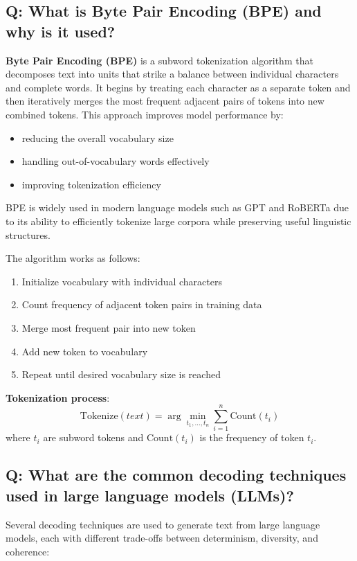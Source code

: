 \subsection*{Q: What is Byte Pair Encoding (BPE) and why is it used?}
\textbf{Byte Pair Encoding (BPE)} is a subword tokenization algorithm that decomposes text into units that strike a balance between individual characters and complete words. It begins by treating each character as a separate token and then iteratively merges the most frequent adjacent pairs of tokens into new combined tokens. This approach improves model performance by:
\begin{itemize}
	\item reducing the overall vocabulary size
	\item handling out-of-vocabulary words effectively
	\item improving tokenization efficiency
\end{itemize}

BPE is widely used in modern language models such as GPT and RoBERTa due to its ability to efficiently tokenize large corpora while preserving useful linguistic structures.

The algorithm works as follows:
\begin{enumerate}
	\item Initialize vocabulary with individual characters
	\item Count frequency of adjacent token pairs in training data
	\item Merge most frequent pair into new token
	\item Add new token to vocabulary
	\item Repeat until desired vocabulary size is reached
\end{enumerate}

\textbf{Tokenization process}:
\[
	\text{Tokenize}(text) = \arg\min_{t_1, \ldots, t_n} \sum_{i=1}^{n} \text{Count}(t_i)
\]
where \(t_i\) are subword tokens and \(\text{Count}(t_i)\) is the frequency of token \(t_i\).

\subsection*{Q: What are the common decoding techniques used in large language models (LLMs)?}
Several decoding techniques are used to generate text from large language models, each with different trade-offs between determinism, diversity, and coherence:

